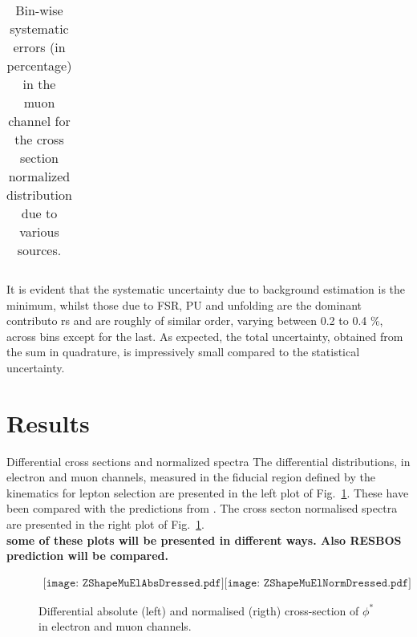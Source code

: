 \begin{table}
\caption{Bin-wise systematic errors (in percentage) in the muon channel for the cross section normalized \phistar distribution due to various sources.} 
\label{tab:musystN}
\begin{center}
\begin{tabular}{ | c | r | r | r | r | r | r | r | r |}%
\hline

\end{tabular}
\end{center}
\end{table}

It is evident that the systematic uncertainty due to background estimation is the minimum, whilst those due to FSR, PU and unfolding are the dominant contributo rs and are roughly of similar order, varying between 0.2 to 0.4 \%, across bins except for the last. As expected, the total uncertainty, obtained from the sum in quadrature, is impressively small compared to the statistical uncertainty. 

\section{Results}
\label{sec:results}

{Differential cross sections and normalized spectra}
The differential \phistar distributions, in electron and muon channels, measured
in the fiducial region defined by the kinematics for lepton selection are presented in the left plot of Fig.~\ref{fig:EM}. These have been  compared with the predictions from  \MADGRAPH. The cross secton normalised spectra are presented in the right plot of Fig.~\ref{fig:EM}. \\
{\bf some of these plots will be presented in different ways. Also RESBOS prediction will be compared.}
\begin{figure}[htp]
\begin{center}$ 
\begin{array}{cc}
\texttt{[image: ZShapeMuElAbsDressed.pdf]}
\texttt{[image: ZShapeMuElNormDressed.pdf]}
\end{array}$
\caption{Differential absolute (left) and normalised (rigth) cross-section of $\phi^{*}$ in electron and muon channels.}
\label{fig:EM}
\end{center}
\end{figure}


